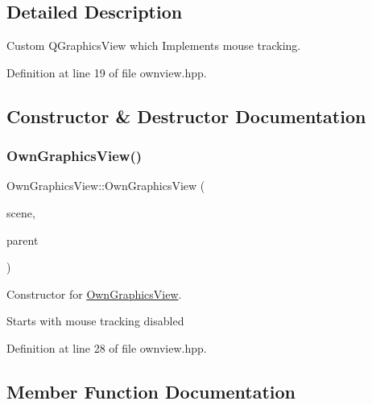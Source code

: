 \subsection{Detailed Description}
Custom Q\+Graphics\+View which Implements mouse tracking. 

Definition at line 19 of file ownview.\+hpp.



\subsection{Constructor \& Destructor Documentation}
\mbox{\label{classOwnGraphicsView_a57f2f9617077ce2a1d30ec3f6c7144db}} 
\subsubsection{\texorpdfstring{Own\+Graphics\+View()}{OwnGraphicsView()}}
{\footnotesize\ttfamily Own\+Graphics\+View\+::\+Own\+Graphics\+View (\begin{DoxyParamCaption}\item[{Q\+Graphics\+Scene $\ast$}]{scene,  }\item[{Q\+Widget $\ast$}]{parent }\end{DoxyParamCaption})\hspace{0.3cm}{\ttfamily [inline]}}



Constructor for \mbox{\hyperlink{classOwnGraphicsView}{Own\+Graphics\+View}}. 

Starts with mouse tracking disabled 

Definition at line 28 of file ownview.\+hpp.



\subsection{Member Function Documentation}
\mbox{\label{classOwnGraphicsView_a4902ca3c748bc13040c4d869bf7be291}} 
